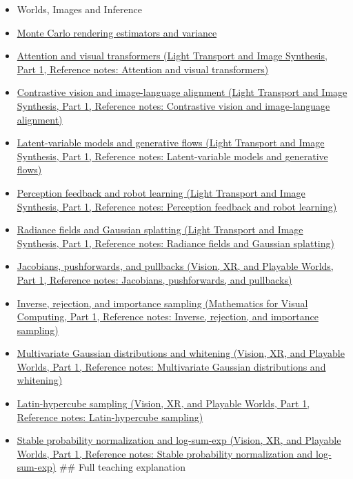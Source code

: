 \begin{itemize}
\item
  {Worlds, Images and Inference}
\item
  \hyperref[appendix-031e02bf28af]{Monte Carlo rendering estimators and variance}
\item
  \href{../04-Light-Transport-and-Image-Synthesis-P01/main.pdf\#nameddest=appendix-a9d5dfdd164a}{Attention and visual transformers (Light Transport and Image Synthesis, Part 1, Reference notes: Attention and visual transformers)}
\item
  \href{../04-Light-Transport-and-Image-Synthesis-P01/main.pdf\#nameddest=appendix-772f1fd96148}{Contrastive vision and image-language alignment (Light Transport and Image Synthesis, Part 1, Reference notes: Contrastive vision and image-language alignment)}
\item
  \href{../04-Light-Transport-and-Image-Synthesis-P01/main.pdf\#nameddest=appendix-2c568f05ee34}{Latent-variable models and generative flows (Light Transport and Image Synthesis, Part 1, Reference notes: Latent-variable models and generative flows)}
\item
  \href{../04-Light-Transport-and-Image-Synthesis-P01/main.pdf\#nameddest=appendix-b0c42da325f1}{Perception feedback and robot learning (Light Transport and Image Synthesis, Part 1, Reference notes: Perception feedback and robot learning)}
\item
  \href{../04-Light-Transport-and-Image-Synthesis-P01/main.pdf\#nameddest=appendix-c5b332e400e7}{Radiance fields and Gaussian splatting (Light Transport and Image Synthesis, Part 1, Reference notes: Radiance fields and Gaussian splatting)}
\item
  \href{../07-Vision-XR-and-Playable-Worlds-P01/main.pdf\#nameddest=appendix-d8a7ddb675eb}{Jacobians, pushforwards, and pullbacks (Vision, XR, and Playable Worlds, Part 1, Reference notes: Jacobians, pushforwards, and pullbacks)}
\item
  \href{../02-Mathematics-for-Visual-Computing-P01/main.pdf\#nameddest=appendix-8d863ed954d0}{Inverse, rejection, and importance sampling (Mathematics for Visual Computing, Part 1, Reference notes: Inverse, rejection, and importance sampling)}
\item
  \href{../07-Vision-XR-and-Playable-Worlds-P01/main.pdf\#nameddest=appendix-12bbe185dbe5}{Multivariate Gaussian distributions and whitening (Vision, XR, and Playable Worlds, Part 1, Reference notes: Multivariate Gaussian distributions and whitening)}
\item
  \href{../07-Vision-XR-and-Playable-Worlds-P01/main.pdf\#nameddest=appendix-1c5e85693a06}{Latin-hypercube sampling (Vision, XR, and Playable Worlds, Part 1, Reference notes: Latin-hypercube sampling)}
\item
  \href{../07-Vision-XR-and-Playable-Worlds-P01/main.pdf\#nameddest=appendix-d580b422240f}{Stable probability normalization and log-sum-exp (Vision, XR, and Playable Worlds, Part 1, Reference notes: Stable probability normalization and log-sum-exp)} \#\# Full teaching explanation
\end{itemize}

